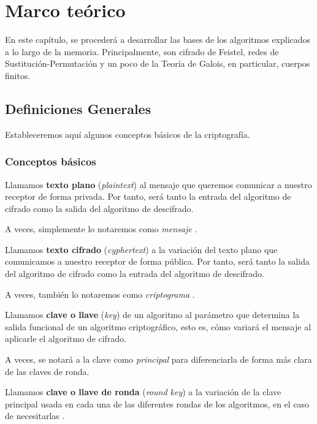 \chapter{Marco teórico}
\label{chp:prelim}
En este capítulo, se procederá a desarrollar las bases de los algoritmos explicados a lo largo de la memoria. 
Principalmente, son cifrado de Feistel, redes de Sustitución-Permutación y un poco de la Teoría de Galois, en particular, cuerpos finitos.

\section{Definiciones Generales}
\label{sec:generaldef}

Estableceremos aquí algunos conceptos básicos de la criptografía.

\subsection{Conceptos básicos}
\begin{dfn}
	Llamamos \textbf{texto plano} (\textit{plaintext}) al mensaje que queremos comunicar a nuestro receptor de forma privada. Por tanto, será tanto la entrada del algoritmo de cifrado como la salida del algoritmo de descifrado.
	
	A veces, simplemente lo notaremos como \textit{mensaje} \cite{Crypto_Bases}.
\end{dfn}

\begin{dfn}
	Llamamos \textbf{texto cifrado} (\textit{cyphertext}) a la variación del texto plano que comunicamos a nuestro receptor de forma pública. Por tanto, será tanto la salida del algoritmo de cifrado como la entrada del algoritmo de descifrado.
	
	A veces, también lo notaremos como \textit{criptograma} \cite{Crypto_Bases}.
\end{dfn}

\begin{dfn}
	Llamamos \textbf{clave o llave} (\textit{key}) de un algoritmo al parámetro que determina la salida funcional de un algoritmo criptográfico, esto es, cómo variará el mensaje al aplicarle el algoritmo de cifrado.
	
	A veces, se notará a la clave como \textit{principal} para diferenciarla de forma más clara de las claves de ronda.
	
	Llamamos \textbf{clave o llave de ronda} (\textit{round key}) a la variación de la clave principal usada en cada una de las diferentes rondas de los algoritmos, en el caso de necesitarlas \cite{Crypto_Bases2}.
\end{dfn}

